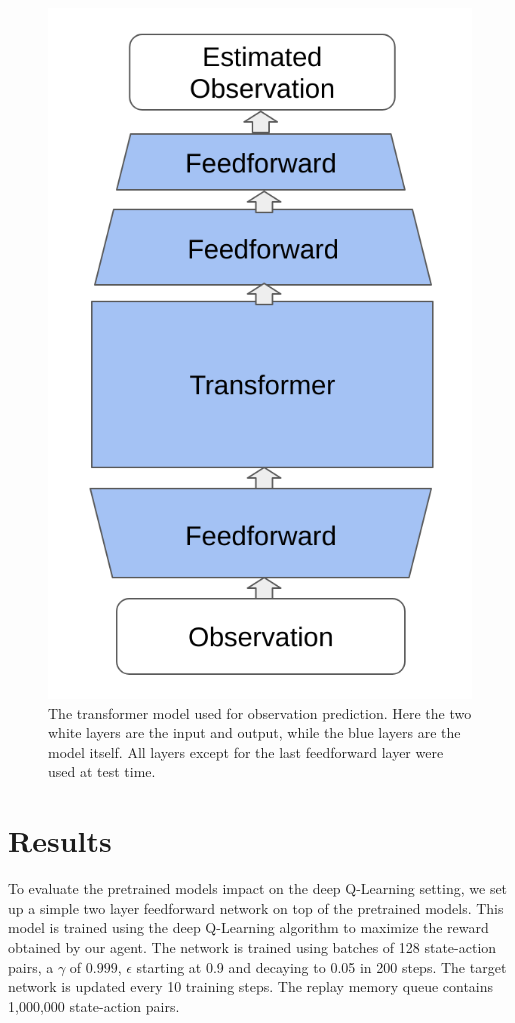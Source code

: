 \documentclass[11pt, twocolumn]{article}
\begin{document}
\begin{figure}
\begin{center}
\includegraphics[scale=0.25]{model_diagram.png}
\caption{The transformer model used for observation prediction. Here the two white layers are the input and output, while the blue layers are the model itself. All layers except for the last feedforward layer were used at test time.}
\label{fig:diagram}
\end{center}
\end{figure}


\section{Results}
To evaluate the pretrained models impact on the deep Q-Learning setting, we set up a simple two layer feedforward network on top of the pretrained models. This model is trained using the deep Q-Learning algorithm to maximize the reward obtained by our agent. The network is trained using batches of 128 state-action pairs, a $\gamma$ of $0.999$, $\epsilon$ starting at 0.9 and decaying to 0.05 in 200 steps. The target network is updated every 10 training steps. The replay memory queue contains 1,000,000 state-action pairs. 
\end{document}
